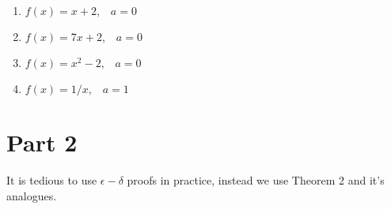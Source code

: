 \documentclass[9pt, a4paper, oneside]{amsart}
\begin{document}
\begin{questions}
\begin{itemize}
		      \begin{enumerate}
		      	\item $f(x)=x+2, \hspace{10pt} a=0$
		      	\item $f(x)=7x+ 2, \hspace{10pt} a=0$
		      	\item $f(x)=x^2-2, \hspace{10pt} a=0$
		      	\item $f(x)=1/x, \hspace{10pt} a=1$
		      \end{enumerate}
	\end{itemize}
\end{questions}








\newpage\section*{Part 2}

It is tedious to use $ \epsilon-\delta $ proofs in practice, instead we use Theorem 2 and it's analogues.\\
\end{document}
